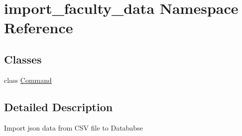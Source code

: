 \hypertarget{namespaceimport__faculty__data}{\section{import\-\_\-faculty\-\_\-data Namespace Reference}
\label{namespaceimport__faculty__data}
}
\subsection*{Classes}
\begin{DoxyCompactItemize}
\item 
class \hyperlink{classimport__faculty__data_1_1_command}{Command}
\end{DoxyCompactItemize}


\subsection{Detailed Description}
\begin{DoxyVerb}Import json data from CSV file to Datababse
\end{DoxyVerb}
 
